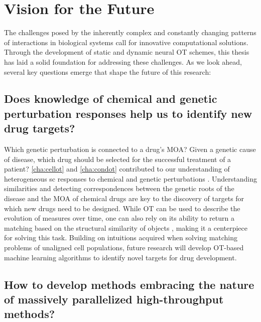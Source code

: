 \section*{Vision for the Future}

The challenges posed by the inherently complex and constantly changing patterns of interactions in biological systems call for innovative computational solutions. Through the development of static and dynamic neural \acrlong{OT} schemes, this thesis has laid a solid foundation for addressing these challenges.
As we look ahead, several key questions emerge that shape the future of this research:

\subsection*{\textbf{Does knowledge of chemical and genetic perturbation responses help us to identify new drug targets?}}

Which genetic perturbation is connected to a drug's \acrlong{MOA}? Given a genetic cause of disease, which drug should be selected for the successful treatment of a patient?
\cref{cha:cellot} and \cref{cha:condot} contributed to our understanding of heterogeneous \acrlong{sc} responses to chemical and genetic perturbations \citep[]{bunne2019learning, bunne2022supervised}.
Understanding similarities and detecting correspondences between the genetic roots of the disease and the \acrlong{MOA} of chemical drugs are key to the discovery of targets for which new drugs need to be designed.
While \acrlong{OT} can be used to describe the evolution of measures over time, one can also rely on its ability to return a matching based on the structural similarity of objects \citep{memoli2011gromov, bunne2019learning}, making it a centerpiece for solving this task.
Building on intuitions acquired when solving matching problems of unaligned cell populations, future research will develop \acrshort{OT}-based machine learning algorithms to identify novel targets for drug development.


\subsection*{\textbf{How to develop methods embracing the nature of massively parallelized high-throughput methods?}}

